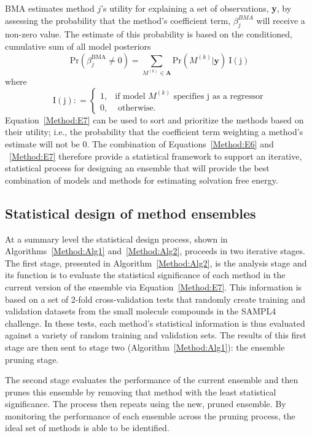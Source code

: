 \documentclass[journal=jpcbfk, manuscript=article]{achemso}
\newcommand{\+}[1]{\ensuremath{\mathbf{#1}}}
\begin{document}
BMA estimates method $j$'s utility for explaining a set of observations, \textbf{y}, by assessing the probability that the method's coefficient term, $\beta^{BMA}_j$ will receive a non-zero value.
The estimate of this probability is based on the conditioned, cumulative sum of all model posteriors
\begin{equation} \label{Method:E7} 
	\mathrm{Pr}(\beta_j^{\text{BMA}}\neq 0) =   \sum_{M^{(k)}\in\mathbf{A}} {\mathrm{Pr}}(M^{(k)} | \textbf{y}) \:{\mathrm{I(j)}}
\end{equation}
where
\begin{equation} \label{eq:bma-prob-neq0-ID}
	\mathrm{I(j)}: =
	\begin{cases} 
		1,&\text{if model $M^{(k)}$ specifies j as a regressor} \\
		0,&\text{ otherwise}.
	\end{cases}
\end{equation}
Equation~\ref{Method:E7} can be used to sort and prioritize the methods based on their utility; i.e., the probability that the coefficient term weighting a method's estimate will not be 0.
The combination of Equations~\ref{Method:E6} and ~\ref{Method:E7} therefore provide a statistical framework to support an iterative, statistical process for designing an ensemble that will provide the best combination of models and methods for estimating solvation free energy.



 \subsection{Statistical design of method ensembles}
 \label{Method:StatEnsemble:Design}
At a summary level the statistical design process, shown in Algorithms~\ref{Method:Alg1} and~\ref{Method:Alg2}, proceeds in two iterative stages.  
The first stage, presented in Algorithm~\ref{Method:Alg2}, is the analysis stage and its function is to evaluate the statistical significance of each method in the current version of the ensemble via Equation~\ref{Method:E7}.
This information is based on a set of 2-fold cross-validation tests that randomly create training and validation datasets from the small molecule compounds  in the SAMPL4 challenge.
In these tests, each method's statistical information is thus evaluated against a variety of random training and validation sets.
The results of this first stage are then sent to stage two (Algorithm~\ref{Method:Alg1}): the ensemble pruning stage.

The second stage evaluates the performance of the current ensemble and then prunes this ensemble by removing that method with the least statistical significance.
The process then repeats using the new, pruned ensemble.
By monitoring the performance of each ensemble across the pruning process, the ideal set of methods is able to be identified.
\end{document}

